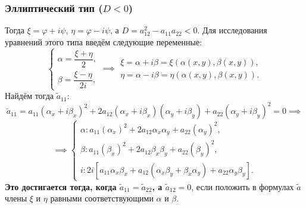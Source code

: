 \subsubsection*{Эллиптический тип ($D < 0$)}
Тогда $\xi = \varphi + i \psi$, $\eta = \varphi - i \psi$, а $D = a_{12}^2 - a_{11} a_{22} < 0$. Для исследования уравнений этого типа введём следующие переменные:
$$
\begin{cases}
\alpha = \dfrac{\xi + \eta}{2}, \\
\beta = \dfrac{\xi - \eta}{2i},
\end{cases}
\implies
\begin{matrix}
\xi = \alpha + i \beta = \xi(\alpha(x, y), \beta(x, y)), \\
\eta = \alpha - i \beta = \eta(\alpha(x, y), \beta(x, y)).
\end{matrix}
$$
Найдём тогда $\tilde{a}_{11}$:
$$
\tilde{a}_{11} = a_{11} (\alpha_x + i \beta_x)^2 + 2 a_{12} (\alpha_x + i \beta_x)(\alpha_y + i \beta_y) + a_{22} (\alpha_y + i \beta_y)^2 = 0 \implies
$$
$$
\implies
\begin{cases}
\alpha: a_{11} (\alpha_x)^2 + 2 a_{12} \alpha_x \alpha_y + a_{22} (\alpha_y)^2, \\
\beta: a_{11} (\beta_x)^2 + 2 a_{12} \beta_x \beta_y + a_{22} (\beta_y)^2, \\
i: 2i [a_{11} \alpha_x \beta_x + a_{12} (\alpha_x \beta_y + \beta_x \alpha_y) + a_{22} \alpha_y \beta_y].
\end{cases}
$$
\textbf{Это достигается тогда, когда $\tilde{a}_{11} = \tilde{a}_{22}$, а $\tilde{a}_{12} = 0$}, если положить в формулах $\tilde{a}$ члены $\xi$ и $\eta$ равными соответствующими $\alpha$ и $\beta$.

